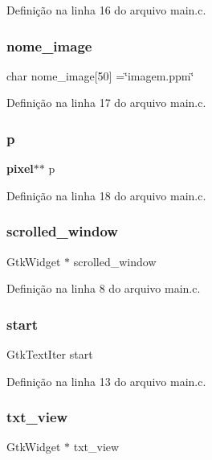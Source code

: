 Definição na linha 16 do arquivo main.\+c.

\mbox{\label{main_8c_a415d68e4cdf6269c2a427673b7c42270}} 
\subsubsection{nome\+\_\+image}
{\footnotesize\ttfamily char nome\+\_\+image[50] =\char`\"{}imagem.\+ppm\char`\"{}}



Definição na linha 17 do arquivo main.\+c.

\mbox{\label{main_8c_ad05bfdf9fff10743f94ed543e45edc07}} 
\subsubsection{p}
{\footnotesize\ttfamily \textbf{ pixel}$\ast$$\ast$ p}



Definição na linha 18 do arquivo main.\+c.

\mbox{\label{main_8c_aacb93815c3ae8fded84121316ac8b0c1}} 
\subsubsection{scrolled\+\_\+window}
{\footnotesize\ttfamily Gtk\+Widget $\ast$ scrolled\+\_\+window}



Definição na linha 8 do arquivo main.\+c.

\mbox{\label{main_8c_a6e6a747990629218d871b4942a1e67fa}} 
\subsubsection{start}
{\footnotesize\ttfamily Gtk\+Text\+Iter start}



Definição na linha 13 do arquivo main.\+c.

\mbox{\label{main_8c_aa20c34e384427574cd53f942c8a91228}} 
\subsubsection{txt\+\_\+view}
{\footnotesize\ttfamily Gtk\+Widget $\ast$ txt\+\_\+view}



